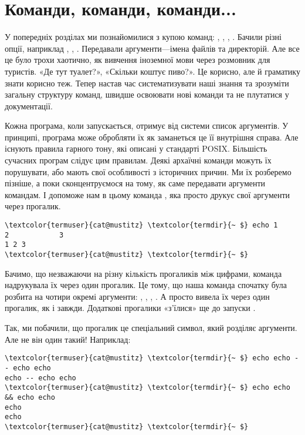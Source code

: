 \section{Команди, команди, команди...}

У попередніх розділах ми познайомилися з купою команд: , , , .
Бачили різні опції, наприклад , , .
Передавали аргументи---імена файлів та директорій.
Але все це було трохи хаотично, як вивчення іноземної мови через розмовник для туристів.
«Де тут туалет?», «Скільки коштує пиво?».
Це корисно, але й граматику знати корисно теж.
Тепер настав час систематизувати наші знання та зрозуміти загальну структуру команд,
швидше освоювати нові команди та не плутатися у документації.

Кожна програма, коли запускається, отримує від системи список аргументів.
У принципі, програма може обробляти їх як заманеться це її внутрішня справа.
Але існують правила гарного тону, які описані у стандарті POSIX.
Більшість сучасних програм слідує цим правилам.
Деякі архаїчні команди можуть їх порушувати,
або мають свої особливості з історичних причин.
Ми їх розберемо пізніше, а поки сконцентруємося на тому,
як саме передавати аргументи командам.
І допоможе нам в цьому команда ,
яка просто друкує свої аргументи через прогалик.

\begin{Verbatim}[fontsize=\footnotesize,commandchars=\\\{\},xleftmargin=\parindent]
\textcolor{termuser}{cat@mustitz} \textcolor{termdir}{~ $} echo 1     2            3
1 2 3
\textcolor{termuser}{cat@mustitz} \textcolor{termdir}{~ $}
\end{Verbatim}

Бачимо, що незважаючи на різну кількість прогаликів між цифрами,
команда  надрукувала їх через один прогалик.
Це тому, що наша команда спочатку була розбита на чотири окремі аргументи:
, , , .
А  просто вивела їх через один прогалик, як і завжди.
Додаткові прогалики «з'їлися» ще до запуски .

Так, ми побачили, що прогалик це спеціальний символ, який розділяє аргументи.
Але не він один такий!
Наприклад:

\begin{Verbatim}[fontsize=\footnotesize,commandchars=\\\{\},xleftmargin=\parindent]
\textcolor{termuser}{cat@mustitz} \textcolor{termdir}{~ $} echo echo -- echo echo
echo -- echo echo
\textcolor{termuser}{cat@mustitz} \textcolor{termdir}{~ $} echo echo && echo echo
echo
echo
\textcolor{termuser}{cat@mustitz} \textcolor{termdir}{~ $}
\end{Verbatim}

